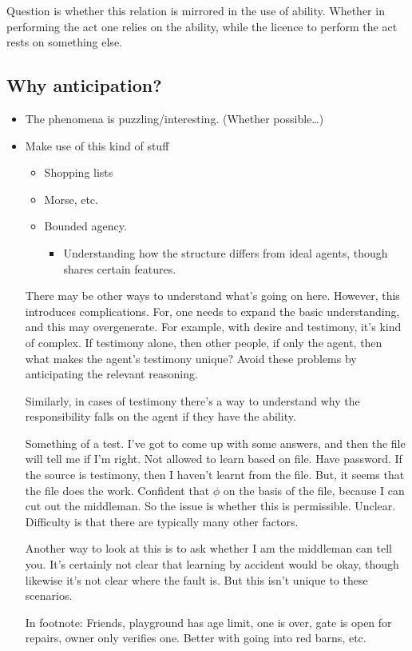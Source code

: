 \documentclass[10pt]{article}
\begin{document}
Question is whether this relation is mirrored in the use of ability.
Whether in performing the act one relies on the ability, while the licence to perform the act rests on something else.


\subsection{Why anticipation?}
\label{sec:why-anticipation}

\begin{itemize}
\item The phenomena is puzzling/interesting. (Whether possible\dots)
\item Make use of this kind of stuff
  \begin{itemize}
  \item Shopping lists
  \item Morse, etc.
  \item Bounded agency.
    \begin{itemize}
    \item Understanding how the structure differs from ideal agents, though shares certain features.
    \end{itemize}
  \end{itemize}
  There may be other ways to understand what's going on here.
  However, this introduces complications.
  For, one needs to expand the basic understanding, and this may overgenerate.
  For example, with desire and testimony, it's kind of complex.
  If testimony alone, then other people, if only the agent, then what makes the agent's testimony unique?
  Avoid these problems by anticipating the relevant reasoning.

  Similarly, in cases of testimony there's a way to understand why the responsibility falls on the agent if they have the ability.
  \begin{scenario}
    Something of a test.
    I've got to come up with some answers, and then the file will tell me if I'm right.
    Not allowed to learn based on file.
    Have password.
    If the source is testimony, then I haven't learnt from the file.
    But, it seems that the file does the work.
    Confident that \(\phi\) on the basis of the file, because I can cut out the middleman.
    So the issue is whether this is permissible.
    Unclear.
    Difficulty is that there are typically many other factors.

    Another way to look at this is to ask whether I am the middleman can tell you.
    It's certainly not clear that learning by accident would be okay, though likewise it's not clear where the fault is.
    But this isn't unique to these scenarios.

    In footnote:
    Friends, playground has age limit, one is over, gate is open for repairs, owner only verifies one.
    Better with going into red barns, etc.
  \end{scenario}
\end{itemize}
\end{document}
